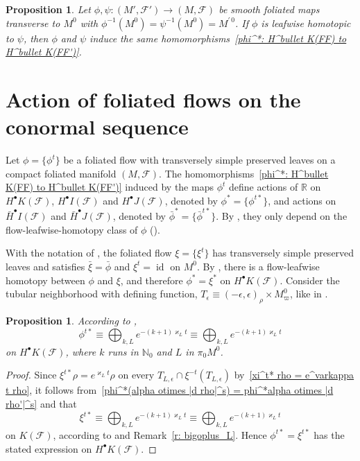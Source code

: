 \documentclass{memo-l}
\theoremstyle{plain}
\newtheorem{prop}[thm]{Proposition}
\theoremstyle{definition}
\theoremstyle{remark}
\newcommand{\N}{\mathbb{N}}
\newcommand{\R}{\mathbb{R}}
\newcommand{\FF}{\mathcal{F}}
\newcommand{\id}{\operatorname{id}}
\numberwithin{section}{chapter}
\numberwithin{equation}{section}%
\begin{document}
\begin{prop}\label{p: leafwise homotopy invariance - H^bullet K(FF)}
 Let $\phi,\psi:(M',\FF')\to(M,\FF)$ be smooth foliated maps transverse to $M^0$ with $\phi^{-1}(M^0)=\psi^{-1}(M^0)=M^{\prime\,0}$. If $\phi$ is leafwise homotopic to $\psi$, then $\phi$ and $\psi$ induce the same homomorphisms~\eqref{phi^*: H^bullet K(FF) to H^bullet K(FF')}.
\end{prop}



\section{Action of foliated flows on the conormal sequence}\label{s: action of foliated flows on the conormal seq}

Let $\phi=\{\phi^t\}$ be a foliated flow with transversely simple preserved leaves on a compact foliated manifold $(M,\FF)$. The homomorphisms~\eqref{phi^*: H^bullet K(FF) to H^bullet K(FF')} induced by the maps $\phi^t$ define actions of $\R$ on $H^\bullet K(\FF)$, $H^\bullet I(\FF)$ and $H^\bullet J(\FF)$, denoted by $\phi^*=\{\phi^{t*}\}$, and actions on $\bar H^\bullet I(\FF)$ and $\bar H^\bullet J(\FF)$, denoted by $\bar\phi^*=\{\bar\phi^{t*}\}$.  By , they only depend on the flow-leafwise-homotopy class of $\phi$ ().

With the notation of , the foliated flow $\xi=\{\xi^t\}$ has transversely simple preserved leaves and satisfies $\bar\xi=\bar\phi$ and $\xi^t=\id$ on $M^0$. By , there is a flow-leafwise homotopy between $\phi$ and $\xi$, and therefore $\phi^*=\xi^*$ on $H^\bullet K(\FF)$. Consider the tubular neighborhood with defining function, $T_\epsilon\equiv(-\epsilon,\epsilon)_\rho\times M^0_\varpi$, like in .

\begin{prop}\label{p: phi^t* equiv bigoplus_L k e^-(k+1) varkappa_L t}
According to ,
\[
\phi^{t*}\equiv\bigoplus_{k,L}e^{-(k+1)\varkappa_Lt}\equiv\bigoplus_{k,L}e^{-(k+1)\varkappa_Lt}
\]
on $H^\bullet K(\FF)$, where $k$ runs in $\N_0$ and $L$ in $\pi_0M^0$.
\end{prop}

\begin{proof}
Since $\xi^{t*}\rho=e^{\varkappa_Lt}\rho$ on every $T_{L,\epsilon}\cap\xi^{-t}(T_{L,\epsilon})$ by~\eqref{xi^t* rho = e^varkappa t rho}, it follows from~\eqref{phi^*(alpha otimes |d rho|^s) = phi^*alpha otimes |d rho'|^s} and  that
\[
\xi^{t*}\equiv\bigoplus_{k,L}e^{-(k+1)\varkappa_Lt}\equiv\bigoplus_{k,L}e^{-(k+1)\varkappa_Lt}
\]
on $K(\FF)$, according to  and Remark~\ref{r: bigoplus_L}. Hence $\phi^{t*}=\xi^{t*}$ has the stated expression on $H^\bullet K(\FF)$.
\end{proof}
\end{document}
